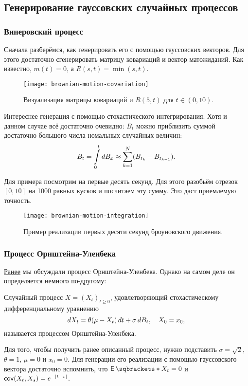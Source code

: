 \subsection{Генерирование гауссовских случайных процессов}
\subsubsection{Винеровский процесс}
Сначала разберёмся, как генерировать его с помощью гауссовских векторов. Для 
этого достаточно сгенерировать матрицу ковариаций и вектор матожиданий. Как 
известно, \(m(t) = 0\), а \(R(s, t) = \min(s, t)\).
\begin{figure}[H]
	\hspace{-0.01\textwidth} 
	\centering\texttt{[image: brownian-motion-covariation]}
	\caption{Визуализация матрицы ковариаций и \(R(5, t)\) для \(t \in (0, 
	10)\).}
\end{figure}

Интереснее генерация с помощью стохастического интегрирования. Хотя и данном 
случае всё достаточно очевидно: \(B_{t}\) можно приблизить суммой достаточно 
большого числа номальных случайных величин:
\[
B_{t} = \int\limits_{0}^{t} \mathop{}\!d B_{x} \approx \sum_{k = 1}^{N} (B_{t_{k}} 
- B_{t_{k - 1}}).
\]

Для примера посмотрим на первые десять секунд. Для этого разобьём отрезок \([0, 
10]\) на 1000 равных кусков и посчитаем эту сумму. Это даст приемлемую точность.
\begin{figure}[H]
	\centering\texttt{[image: brownian-motion-integration]}
	\caption{Пример реализации первых десяти секунд броуновского движения.}
\end{figure}

\subsubsection{Процесс Орнштейна-Уленбека}
\hyperref[ornstein-uhlenbeck-process]{Ранее} мы обсуждали процесс 
Орнштейна-Уленбека. Однако на самом деле он определяется немного по-другому:
\begin{definition}
	Случайный процесс \(X = (X_{t})_{t \geq 0}\), удовлетворяющий 
	стохастическому дифференциальному уравнению
	\[
	\mathop{}\!d X_{t} = \theta(\mu - X_{t})\mathop{}\!d t + \sigma \mathop{}\!d B_{t}, \quad 
	X_{0} = x_{0},
	\]
	называется процессом Орнштейна-Уленбека.
\end{definition}

Для того, чтобы получить ранее описанный процесс, нужно подставить \(\sigma = 
\sqrt{2}\), \(\theta = 1\), \(\mu = 0\) и \(x_{0} = 0\). Для генерации его 
реализации с помощью гауссовского вектора достаточно вспомнить, что \(\E{X_{t}} 
= 0\) и \(\operatorname{\mathsf{cov}}(X_{t}, X_{s}) = e^{-|t - s|}\).

